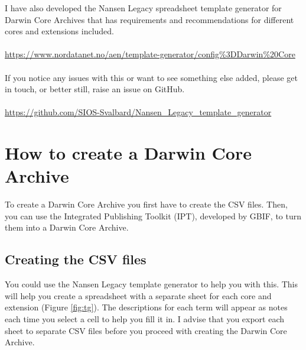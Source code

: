 \documentclass[a4paper,english, 11pt]{article}
\begin{document}
I have also developed the Nansen Legacy spreadsheet template generator for Darwin Core Archives that has requirements and recommendations for different cores and extensions included. 
\\
\\
\url{https://www.nordatanet.no/aen/template-generator/config%3DDarwin%20Core}
\\
\\
If you notice any issues with this or want to see something else added, please get in touch, or better still, raise an issue on GitHub.
\\
\\
\url{https://github.com/SIOS-Svalbard/Nansen_Legacy_template_generator}

\section{How to create a Darwin Core Archive}
\label{s:how}

To create a Darwin Core Archive you first have to create the CSV files. Then, you can use the Integrated Publishing Toolkit (IPT), developed by GBIF, to turn them into a Darwin Core Archive.

\subsection{Creating the CSV files}
\label{ss:CSVs}

You could use the Nansen Legacy template generator to help you with this. This will help you create a spreadsheet with a separate sheet for each core and extension (Figure \ref{fig:tg}). The descriptions for each term will appear as notes each time you select a cell to help you fill it in. I advise that you export each sheet to separate CSV files before you proceed with creating the Darwin Core Archive.
\end{document}
